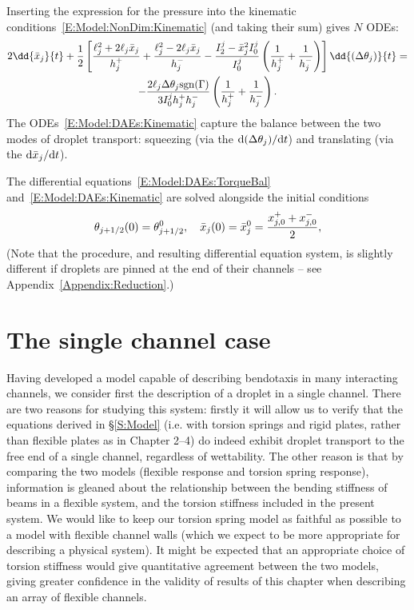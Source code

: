 Inserting the expression for the pressure into the kinematic conditions~\eqref{E:Model:NonDim:Kinematic} (and taking their sum) gives $N$ ODEs:
\begin{multline}\label{E:Model:DAEs:Kinematic}
2\dd{\xbarj}{t}  +\frac{1}{2} \left[\frac{\ellj^2 + 2\ellj \xbarj}{h_j^+} + \frac{\ellj^2 - 2\ellj \xbarj}{h_j^-} -  \frac{I_2^j - \xbar_j^2 I_0^j}{I_0^j} \left(\frac{1}{h_j^+} + \frac{1}{h_j^-}\right)\right]\dd{(\dthetaj)}{t} =\\
-\frac{2\ellj\dthetaj\sgn(\Gamma)}{3I_0^j h_j^+ h_j^-} \left(\frac{1}{h_j^+} + \frac{1}{h_j^-}\right).
\end{multline}
The ODEs~\eqref{E:Model:DAEs:Kinematic} capture the balance between the two modes of droplet transport: squeezing (via the $\mathrm{d}(\Delta \theta_j)/\mathrm{d}t$) and translating (via the $\mathrm{d}\bar{x}_j/\mathrm{d}t$).

The differential equations~\eqref{E:Model:DAEs:TorqueBal} and~\eqref{E:Model:DAEs:Kinematic} are solved alongside the initial conditions
\begin{equation}\label{E:Model:DAEs:IC}
\theta_{j+1/2}(0) = \theta_{j+1/2}^0,\quad \bar{x}_j(0) =\bar{x}_j^0  = \frac{x_{j,0}^+ + x_{j,0}^-}{2},
\end{equation}
(Note that the procedure, and resulting differential equation system, is slightly different if droplets are pinned at the end of their channels -- see Appendix~\ref{Appendix:Reduction}.)


\section{The single channel case}\label{S:SingleChannel}
Having developed a model capable of describing bendotaxis in many interacting channels, we consider first the description of a droplet in a single channel. There are two reasons for studying this system: firstly it will allow us to verify that the equations derived in \S\ref{S:Model} (i.e. with torsion springs and rigid plates, rather than flexible plates as in Chapter 2--4) do indeed exhibit droplet transport to the free end of a single channel, regardless of wettability. The other reason is that by comparing the two models (flexible response and torsion spring response), information is gleaned about the relationship between the bending stiffness of beams in a flexible system, and the torsion stiffness included in the present system.  We would  like to keep our torsion spring model as faithful as possible to a model with flexible channel walls (which we expect to be more appropriate for describing a physical system). It might be expected that an appropriate choice of torsion stiffness would give quantitative agreement between the two models, giving greater confidence in the validity of results of this chapter when describing an array of flexible channels.


